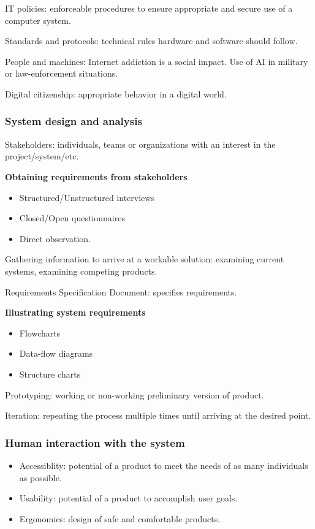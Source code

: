 \documentclass{article}
\begin{document}
IT policies: enforceable procedures to ensure appropriate and secure use of a
computer system.

Standards and protocols: technical rules hardware and software should follow.

People and machines: Internet addiction is a social impact. Use of AI in
military or law-enforcement situations.

Digital citizenship: appropriate behavior in a digital world.

\subsubsection{System design and analysis}

Stakeholders: individuals, teams or organizations with an interest in the
project/system/etc.

\textbf{Obtaining requirements from stakeholders}
\begin{itemize}
    \item Structured/Unstructured interviews
    \item Closed/Open questionnaires
    \item Direct observation.
\end{itemize}

Gathering information to arrive at a workable solution: examining current
systems, examining competing products.

Requirements Specification Document: specifies requirements.

\textbf{Illustrating system requirements}
\begin{itemize}
    \item Flowcharts
    \item Data-flow diagrams
    \item Structure charts
\end{itemize}

Prototyping: working or non-working preliminary version of product.

Iteration: repeating the process multiple times until arriving at the desired
point.

\subsubsection{Human interaction with the system}

\begin{itemize}
    \item Accessiblity: potential of a product to meet the needs of as many
        individuals as possible.
    \item Usability: potential of a product to accomplish user goals.
    \item Ergonomics: design of safe and comfortable products.
\end{itemize}
\end{document}
